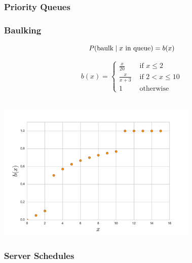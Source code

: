\documentclass{beamer}
\begin{document}
\begin{frame}
\frametitle{Priority Queues}
\begin{figure}
  
\end{figure}
\end{frame}

\begin{frame}
\frametitle{Baulking}
\begin{figure}
  
\end{figure}
\begin{equation*}
P(\text{baulk} \nonscript\; | \nonscript\; x \text{ in queue}) = b(x)
\end{equation*}
\end{frame}

\begin{frame}
\begin{equation*}
b(x) = \left\{ \begin{array}{cc} \frac{x}{20} & \text{ if } x \leq 2\\[4pt] \frac{x}{x+3} & \text{ if } 2 < x \leq 10\\[4pt] 1 & \text{ otherwise}\end{array} \right.
\end{equation*}\\
\begin{center}
\includegraphics[width=0.72\textwidth]{baulkfunc.pdf}
\end{center}
\end{frame}

\begin{frame}
\frametitle{Server Schedules}

\end{frame}

\begin{frame}

\end{frame}
\end{document}
